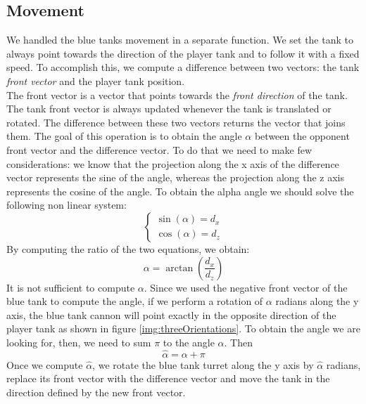 \documentclass[14pt]{article}
\begin{document}
\subsection{Movement}
We handled the blue tanks movement in a separate function. We set the tank to always point towards the direction of the player tank and to follow it with a fixed speed. To accomplish this, we compute a difference between two vectors: the tank \textit{front vector} and the player tank position. \\
The front vector is a vector that points towards the \textit{front direction} of the tank. The tank front vector is always updated whenever the tank is translated or rotated.
The difference between these two vectors returns the vector that joins them. The goal of this operation is to obtain the angle \(\alpha\) between the opponent front vector and the difference vector. To do that we need to make few considerations: we know that the projection along the x axis of the difference vector represents the sine of the angle, whereas the projection along the z axis represents the cosine of the angle. To obtain the alpha angle we should solve the following non linear system:
\begin{equation}\label{eq:followTank}
\begin{cases}
\sin(\alpha) = d_{x}\\
\cos(\alpha) = d_{z}
\end{cases}
\end{equation}
By computing the ratio of the two equations, we obtain: 
\begin{equation}\label{eq:alpha}
\alpha = \arctan\left(\frac{d_{x}}{d_{z}}\right)
\end{equation}
It is not sufficient to compute \(\alpha\). Since we used the negative front vector of the blue tank to compute the angle, if we perform a rotation of \(\alpha\) radians along the y axis, the blue tank cannon will point exactly in the opposite direction of the player tank as shown in figure  \ref{img:threeOrientations}. To obtain the angle we are looking for, then, we need to sum \(\pi\) to the angle \(\alpha\). Then \[\hat{\alpha} = \alpha + \pi\]
Once we compute \(\hat{\alpha}\), we rotate the blue tank turret along the y axis by \(\hat{\alpha}\) radians, replace its front vector with the difference vector and move the tank in the direction defined by the new front vector.\\
\end{document}
